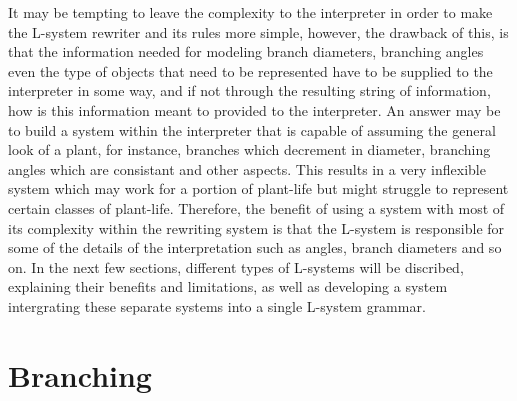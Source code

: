 It may be tempting to leave the complexity to the interpreter in order to make the L-system rewriter and its rules more simple, however, the drawback of this, is that the information needed for modeling branch diameters, branching angles even the type of objects that need to be represented have to be supplied to the interpreter in some way, and if not through the resulting string of information, how is this information meant to provided to the interpreter. An answer may be to build a system within the interpreter that is capable of assuming the general look of a plant, for instance, branches which decrement in diameter, branching angles which are consistant and other aspects. This results in a very inflexible system which may work for a portion of plant-life but might struggle to represent certain classes of plant-life. Therefore, the benefit of using a system with most of its complexity within the rewriting system is that the L-system is responsible for some of the details of the interpretation such as angles, branch diameters and so on. In the next few sections, different types of L-systems will be discribed, explaining their benefits and limitations, as well as developing a system intergrating these separate systems into a single L-system grammar.   


\section{Branching} \label{branching}

